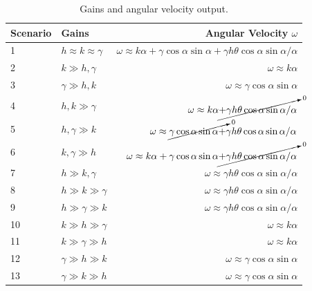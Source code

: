 \documentclass[12pt]{article}
\begin{document}
\begin{table}[ht!]
\caption{Gains and angular velocity output.}
\small
\centering
\begin{tabular}{@{}llr@{}} \toprule
Scenario & Gains                     & Angular Velocity $\omega$ \\ \midrule
1        & $h\approx k\approx\gamma$ & $\omega\approx k\alpha + \gamma\cos\alpha\sin\alpha + \gamma h\theta\cos\alpha\sin\alpha/\alpha$ \\
2        & $k\gg h,\gamma$           & $\omega\approx k\alpha$ \\
3        & $\gamma\gg h,k$           & $\omega\approx \gamma\cos\alpha\sin\alpha$ \\
4        & $h,k \gg\gamma$           & $\omega\approx k\alpha\cancelto{0}{+\gamma h\theta\cos\alpha\sin\alpha/\alpha}$ \\
5        & $h,\gamma\gg k$           & $\omega\approx \cancelto{0}{\gamma\cos\alpha\sin\alpha+} \gamma h\theta\cos\alpha\sin\alpha/\alpha$ \\
6        & $k,\gamma\gg h$           & $\omega\approx k\alpha + \gamma\cos\alpha\sin\alpha \cancelto{0}{+\gamma h\theta\cos\alpha\sin\alpha/\alpha}$ \\
7        & $h\gg k,\gamma$           & $\omega\approx \gamma h\theta\cos\alpha\sin\alpha/\alpha$ \\
8        & $h\gg k\gg\gamma$         & $\omega\approx \gamma h\theta\cos\alpha\sin\alpha/\alpha$ \\
9        & $h\gg\gamma\gg k$         & $\omega\approx \gamma h\theta\cos\alpha\sin\alpha/\alpha$ \\
10       & $k\gg h\gg\gamma$         & $\omega\approx k\alpha$ \\
11       & $k\gg\gamma\gg h$         & $\omega\approx k\alpha$ \\
12       & $\gamma\gg h\gg k$        & $\omega\approx \gamma\cos\alpha\sin\alpha$ \\
13       & $\gamma\gg k\gg h$        & $\omega\approx \gamma\cos\alpha\sin\alpha$ \\ \bottomrule
\end{tabular}
\label{tab:gainsAngVelOutput}
\end{table}
\end{document}
